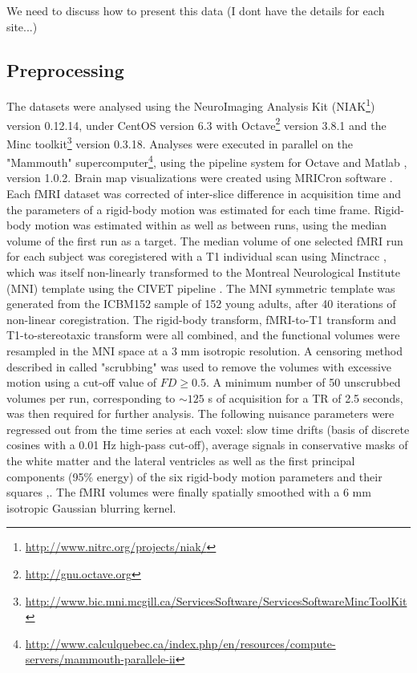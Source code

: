 \documentclass[authoryear]{elsarticle}
\begin{document}
We need to discuss how to present this data (I dont have the details for each site...)

\subsection{Preprocessing}\label{Preprocessing}
The datasets were analysed using the NeuroImaging Analysis Kit (NIAK\footnote{\url{http://www.nitrc.org/projects/niak/}}) version 0.12.14, under CentOS version 6.3 with Octave\footnote{\url{http://gnu.octave.org}} version 3.8.1 and the Minc toolkit\footnote{\url{http://www.bic.mni.mcgill.ca/ServicesSoftware/ServicesSoftwareMincToolKit}} version 0.3.18. Analyses were executed in parallel on the "Mammouth" supercomputer\footnote{\url{http://www.calculquebec.ca/index.php/en/resources/compute-servers/mammouth-parallele-ii}}, using the pipeline system for Octave and Matlab \citep{Bellec2010}, version 1.0.2. Brain map visualizations were created using MRICron software \cite{Rorden2007}. Each fMRI dataset was corrected of inter-slice difference in acquisition time and the parameters of a rigid-body motion was estimated for each time frame. Rigid-body motion was estimated within as well as between runs, using the median volume of the first run as a target. The median volume of one selected fMRI run for each subject 
was 
coregistered with a T1 individual scan using Minctracc \citep{Collins1998}, which was itself non-linearly transformed to the Montreal Neurological Institute (MNI) template \citep{Fonov2011} using the CIVET pipeline \citep{Zijdenbos2002}. The MNI symmetric template was generated from the ICBM152 sample of 152 young adults, after 40 iterations of non-linear coregistration. The rigid-body transform, fMRI-to-T1 transform and T1-to-stereotaxic transform were all combined, and the functional volumes were resampled in the MNI space at a 3 mm isotropic resolution. A censoring method described in \citep{Power2012} called "scrubbing" was used to remove the volumes with excessive motion using a cut-off value of $FD\geq0.5$. A minimum number of 50 unscrubbed volumes per run, corresponding to $\sim 125$ s of acquisition for a TR of 2.5 seconds, was then required for further analysis. The following nuisance parameters were regressed out from the time series at each voxel: slow time drifts (basis of discrete cosines 
with a 0.01 Hz high-pass cut-off), average signals in conservative masks of the white matter and the lateral ventricles as well as the first principal components (95\% energy) of the six rigid-body motion parameters and their squares \citep{Lund2006},\citep{Giove2009}. The fMRI volumes were finally spatially smoothed with a 6 mm isotropic Gaussian blurring kernel. 
\end{document}
